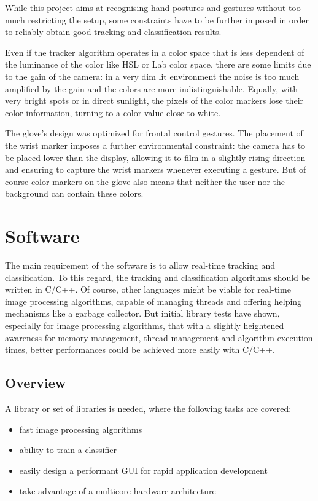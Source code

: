 While this project aims at recognising hand postures and gestures without too much restricting the setup, some constraints have to be further imposed in order to reliably obtain good tracking and classification results. 

Even if the tracker algorithm operates in a color space that is less dependent of the luminance of the color like HSL or Lab color space, there are some limits due to the gain of the camera: in a very dim lit environment the noise is too much amplified by the gain and the colors are more indistinguishable. Equally, with very bright spots or in direct sunlight, the pixels of the color markers lose their color information, turning to a color value close to white.

The glove's design was optimized for frontal control gestures. The placement of the wrist marker imposes a further environmental constraint: the camera has to be placed lower than the display, allowing it to film in a slightly rising direction and ensuring to capture the wrist markers whenever executing a gesture. But of course color markers on the glove also means that neither the user nor the background can contain these colors.

\section{Software}
\label{sec:software}

The main requirement of the software is to allow real-time tracking and classification. To this regard, the tracking and classification algorithms should be written in C/C++. Of course, other languages might be viable for real-time image processing algorithms, capable of managing threads and offering helping mechanisms like a garbage collector. But initial library tests have shown, especially for image processing algorithms, that with a slightly heightened awareness for memory management, thread management and algorithm execution times, better performances could be achieved more easily with C/C++.

\subsection{Overview}
\label{sub:overview}

A library or set of libraries is needed, where the following tasks are covered:

\begin{itemize}
\item fast image processing algorithms
\item ability to train a classifier
\item easily design a performant GUI for rapid application development
\item take advantage of a multicore hardware architecture
\end{itemize}

